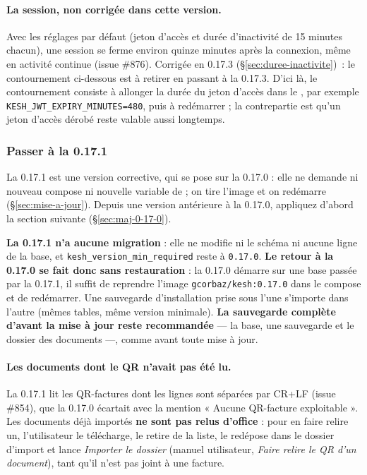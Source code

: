 \documentclass[a4paper,11pt,oneside]{article}
\begin{document}
\begin{sloppypar}
\paragraph{La session, non corrigée dans cette version.} Avec les réglages par défaut (jeton d'accès et durée d'inactivité de 15 minutes chacun), une session se ferme environ quinze minutes après la connexion, même en activité continue (issue \#876). Corrigée en 0.17.3 (\S\ref{sec:duree-inactivite})~: le contournement ci-dessous est à retirer en passant à la 0.17.3. D'ici là, le contournement consiste à allonger la durée du jeton d'accès dans le , par exemple \texttt{KESH\_JWT\_EXPIRY\_MINUTES=480}, puis à redémarrer ; la contrepartie est qu'un jeton d'accès dérobé reste valable aussi longtemps.
\end{sloppypar}

\subsubsection{Passer à la 0.17.1}\label{sec:maj-0-17-1}

La 0.17.1 est une version corrective, qui se pose sur la 0.17.0 : elle ne demande ni nouveau compose ni nouvelle variable de  ; on tire l'image et on redémarre (\S\ref{sec:mise-a-jour}). Depuis une version antérieure à la 0.17.0, appliquez d'abord la section suivante (\S\ref{sec:maj-0-17-0}).

\begin{sloppypar}
\textbf{La 0.17.1 n'a aucune migration} : elle ne modifie ni le schéma ni aucune ligne de la base, et \texttt{kesh\_version\_min\_required} reste à \texttt{0.17.0}. \textbf{Le retour à la 0.17.0 se fait donc sans restauration} : la 0.17.0 démarre sur une base passée par la 0.17.1, il suffit de reprendre l'image \texttt{gcorbaz/kesh:0.17.0} dans le compose et de redémarrer. Une sauvegarde d'installation  prise sous l'une s'importe dans l'autre (mêmes tables, même version minimale). \textbf{La sauvegarde complète d'avant la mise à jour reste recommandée} --- la base, une sauvegarde  et le dossier des documents ---, comme avant toute mise à jour.
\end{sloppypar}

\paragraph{Les documents dont le QR n'avait pas été lu.} La 0.17.1 lit les QR-factures dont les lignes sont séparées par CR+LF (issue \#854), que la 0.17.0 écartait avec la mention « Aucune QR-facture exploitable ». Les documents déjà importés \textbf{ne sont pas relus d'office} : pour en faire relire un, l'utilisateur le télécharge, le retire de la liste, le redépose dans le dossier d'import et lance \emph{Importer le dossier} (manuel utilisateur, \emph{Faire relire le QR d'un document}), tant qu'il n'est pas joint à une facture.
\end{document}
